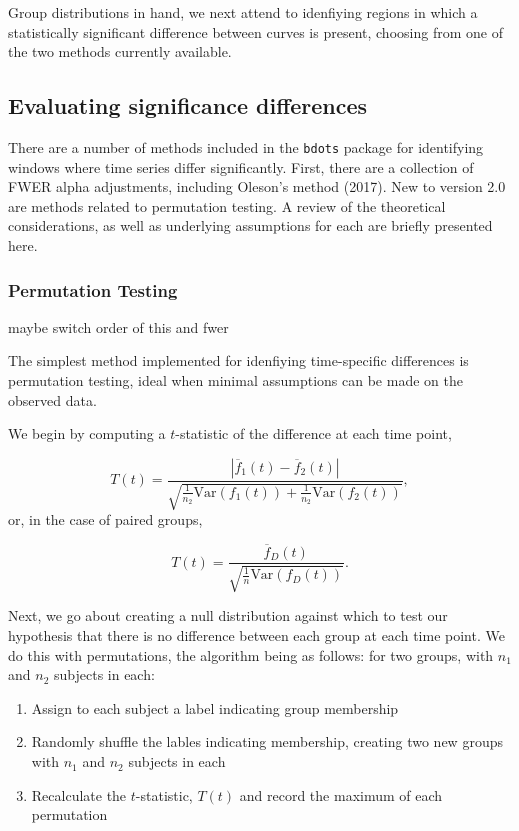 \documentclass{article}
\newcommand{\xt}{\texttt}%
\begin{document}
Group distributions in hand, we next attend to idenfiying regions in which a statistically significant difference between curves is present, choosing from one of the two methods currently available.

\subsection{Evaluating significance differences}

There are a number of methods included in the \xt{bdots} package for identifying windows where time series differ significantly. First, there are a collection of FWER alpha adjustments, including Oleson's method (2017). New to version 2.0 are methods related to permutation testing. A review of the theoretical considerations, as well as underlying assumptions for each are briefly presented here. 


\subsubsection{Permutation Testing}
maybe switch order of this and fwer

The simplest method implemented for idenfiying time-specific differences is permutation testing, ideal when minimal assumptions can be made on the observed data. 

We begin by computing a $t$-statistic of the difference at each time point, 

\begin{equation}
T(t) = \frac{|\overline{f}_1(t) - \overline{f}_2(t)|}{\sqrt{\frac{1}{n_2} \text{Var}(f_1(t)) + \frac{1}{n_2} \text{Var}(f_2(t))}}, 
\end{equation}
or, in the case of paired groups, 

\begin{equation}
T(t) = \frac{\overline{f}_D(t)}{\sqrt{\frac1n \text{Var}(f_D(t))}}.
\end{equation}

Next, we go about creating a null distribution against which to test our hypothesis that there is no difference between each group at each time point. We do this with permutations, the algorithm being as follows: for two groups, with $n_1$ and $n_2$ subjects in each:

\begin{enumerate}
	\item Assign to each subject a label indicating group membership
	\item Randomly shuffle the lables indicating membership, creating two new groups with $n_1$ and $n_2$ subjects in each
	\item Recalculate the $t$-statistic, $T(t)$ and record the maximum of each permutation
\end{enumerate}
\end{document}
